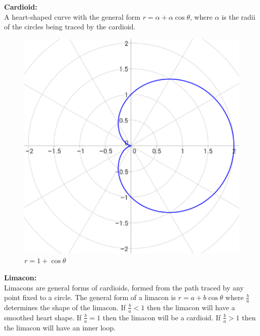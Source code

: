 \documentclass{article}
\begin{document}
        \pagebreak

            \noindent \textbf{Cardioid:} \\
            A heart-shaped curve with the general form $r=\alpha+\alpha\cos\theta$, where $\alpha$ is
            the radii of the circles being traced by the cardioid. \\

            \begin{figure} [hbt!]
                \centering
                \includegraphics[scale=0.4]{Resources/Unit3Vectors/cardioid.PNG}
                \caption*{$r=1+\cos\theta$}
            \end{figure}

            \noindent \textbf{Limacon:} \\
            Limacons are general forms of cardioids, formed from the path traced by any point fixed
            to a circle. The general form of a limacon is $r=a+b\cos\theta$ where $\frac{b}{a}$
            determines the shape of the limacon. If $\frac{b}{a}<1$ then the limacon will have a
            smoothed heart shape. If $\frac{b}{a}=1$ then the limacon will be a cardioid.
            If $\frac{b}{a}>1$ then the limacon will have an inner loop.
\end{document}
